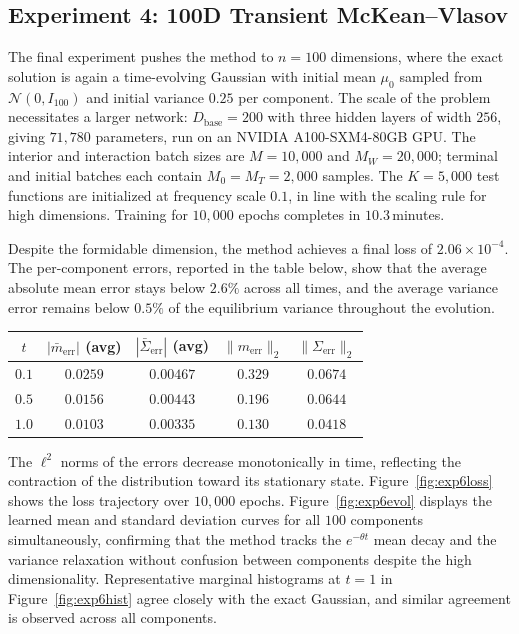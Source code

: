 \documentclass[12pt]{article}
\theoremstyle{plain}
\begin{document}
\subsection{Experiment 4: 100D Transient McKean--Vlasov}
\label{sec:exp6}

The final experiment pushes the method to $n=100$ dimensions, where the exact solution
is again a time-evolving Gaussian with initial mean $\mu_0$ sampled from
$\mathcal{N}(0,I_{100})$ and initial variance $0.25$ per component. The scale of the
problem necessitates a larger network: $D_\mathrm{base}=200$ with three hidden layers of
width $256$, giving $71{,}780$ parameters, run on an NVIDIA A100-SXM4-80GB GPU. The
interior and interaction batch sizes are $M=10{,}000$ and $M_W=20{,}000$; terminal and
initial batches each contain $M_0=M_T=2{,}000$ samples. The $K=5{,}000$ test functions
are initialized at frequency scale $0.1$, in line with the scaling rule for high
dimensions. Training for $10{,}000$ epochs completes in $10.3\,$minutes.

Despite the formidable dimension, the method achieves a final loss of $2.06\times10^{-4}$.
The per-component errors, reported in the table below, show that the average absolute
mean error stays below $2.6\%$ across all times, and the average variance error remains
below $0.5\%$ of the equilibrium variance throughout the evolution.

\begin{center}
\begin{tabular}{ccccc}
\toprule
$t$ & $|\bar{m}_\mathrm{err}|$ (avg) & $|\bar{\Sigma}_\mathrm{err}|$ (avg)
    & $\|m_\mathrm{err}\|_2$ & $\|\Sigma_\mathrm{err}\|_2$ \\
\midrule
$0.1$ & $0.0259$ & $0.00467$ & $0.329$ & $0.0674$ \\
$0.5$ & $0.0156$ & $0.00443$ & $0.196$ & $0.0644$ \\
$1.0$ & $0.0103$ & $0.00335$ & $0.130$ & $0.0418$ \\
\bottomrule
\end{tabular}
\end{center}

The $\ell^2$ norms of the errors decrease monotonically in time, reflecting the
contraction of the distribution toward its stationary state. Figure~\ref{fig:exp6loss}
shows the loss trajectory over $10{,}000$ epochs. Figure~\ref{fig:exp6evol} displays the
learned mean and standard deviation curves for all $100$ components simultaneously,
confirming that the method tracks the $e^{-\theta t}$ mean decay and the variance
relaxation without confusion between components despite the high dimensionality.
Representative marginal histograms at $t=1$ in Figure~\ref{fig:exp6hist} agree closely
with the exact Gaussian, and similar agreement is observed across all components.
\end{document}
